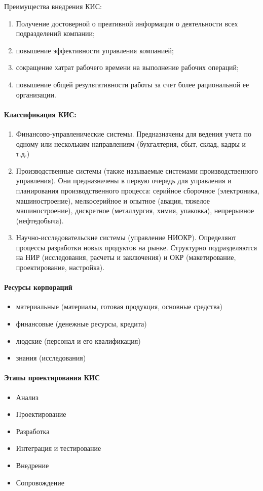 Преимущества внедрения КИС:
\begin{enumerate}
  \item Получение достоверной о преативной информации о деятельности всех
    подразделений компании;
  \item повышение эффективности управления компанией;
  \item сокращение хатрат рабочего времени на выполнение рабочих операций;
  \item повышение общей результативности работы за счет более рациональной ее
    организации.
\end{enumerate}

\paragraph{Классификация КИС:}\mbox{}\par
\begin{enumerate}
  \item Финансово-управленические системы. Предназначены для ведения учета по
    одному или нескольким направлениям (бухгалтерия, сбыт, склад, кадры и т.д.)
  \item Производственные системы (также называемые системами производственного
    управления). Они предназначены в первую очередь для управления и
    планирования производственного процесса: серийное сборочное (электроника,
    машиностроение), мелкосерийное и опытное (авация, тяжелое машиностроение),
    дискретное (металлургия, химия, упаковка), непрерывное (нефтедобыча).
  \item Научно-исследовательские системы (управление НИОКР). Определяют процессы
    разработки новых продуктов на рынке. Структурно подразделяются на НИР
    (исследования, расчеты и заключения) и ОКР (макетирование, проектирование,
    настройка).
\end{enumerate}

\paragraph{Ресурсы корпораций}\mbox{}\par
\begin{itemize}
  \item материальные (материалы, готовая продукция, основные средства)
  \item финансовые (денежные ресурсы, кредита)
  \item людские (персонал и его квалификация)
  \item знания (исследования)
\end{itemize}

\paragraph{Этапы проектирования КИС}\mbox{}\par
\begin{itemize}
  \item Анализ
  \item Проектирование
  \item Разработка
  \item Интеграция и тестирование
  \item Внедрение
  \item Сопровождение
\end{itemize}
